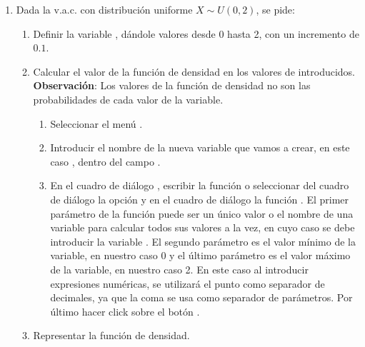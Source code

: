 \begin{enumerate}[leftmargin=*]
\item Dada la v.a.c. con distribución uniforme $X \sim U(0,2)$, se pide:

\begin{enumerate}
\item Definir la variable , dándole valores desde 0 hasta 2, 
con un incremento de $0.1$.

\item Calcular el valor de la función de densidad en los valores de 
 introducidos.\\ 
\textbf{Observación}: Los valores de la función de densidad no son las 
probabilidades de cada valor de la variable. 
\begin{indicacion}
\begin{enumerate}
\item Seleccionar el menú .

\item Introducir el nombre de la nueva variable que vamos a crear, en 
este caso , dentro del campo 
.

\item En el cuadro de diálogo , escribir la 
función  o seleccionar del cuadro de 
diálogo  la opción  y en el 
cuadro de diálogo  la 
función . El primer parámetro de la función 
 puede ser un único valor o el nombre 
de una variable para calcular todos sus valores a la vez, en cuyo caso 
se debe introducir la variable .
El segundo parámetro es el valor mínimo de la variable, en nuestro 
caso 0 y el último parámetro es el valor máximo de
la variable, en nuestro caso 2. En este caso al introducir expresiones 
numéricas, se utilizará el punto como separador de decimales, ya que la 
coma se usa como separador de parámetros. Por último hacer click sobre 
el botón .
\end{enumerate}
\end{indicacion}

\item Representar la función de densidad.


\end{enumerate}
\end{enumerate}
